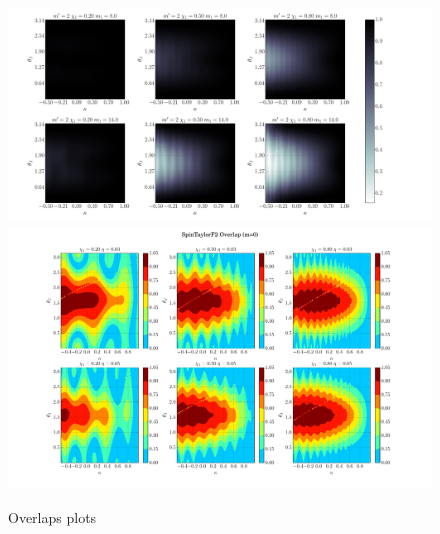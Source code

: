 \label{fig:P2} 
\begin{figure}[t]
\includegraphics[width=\textwidth]{./images/OVLP_GRID_P2.pdf}
\includegraphics[width=\textwidth]{./images/OVLP_GRID_P0.pdf}
\caption{Overlaps plots} 
\centering 
\end{figure}









